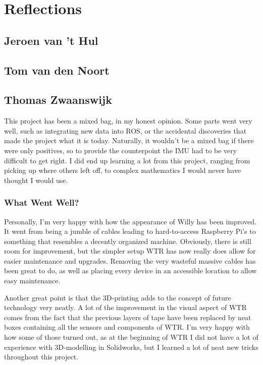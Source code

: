 \section{Reflections}
\subsection{Jeroen van 't Hul}

\newpage

\subsection{Tom van den Noort}

\newpage

\subsection{Thomas Zwaanswijk}
This project has been a mixed bag, in my honest opinion.
Some parts went very well, such as integrating new data into ROS, or the accidental discoveries that made the project what it is today.
Naturally, it wouldn't be a mixed bag if there were only positives, so to provide the counterpoint the IMU had to be very difficult to get right.
I did end up learning a lot from this project, ranging from picking up where others left off, to complex mathematics I would never have thought I would use.

\subsubsection{What Went Well?}
Personally, I'm very happy with how the appearance of Willy has been improved.
It went from being a jumble of cables leading to hard-to-access Raspberry Pi's to something that resembles a decently organized machine.
Obviously, there is still room for improvement, but the simpler setup WTR has now really does allow for easier maintenance and upgrades.
Removing the very wasteful massive cables has been great to do, as well as placing every device in an accessible location to allow easy maintenance.

Another great point is that the 3D-printing adds to the concept of future technology very neatly.
A lot of the improvement in the visual aspect of WTR comes from the fact that the previous layers of tape have been replaced by neat boxes containing all the sensors and components of WTR.
I'm very happy with how some of those turned out, as at the beginning of WTR I did not have a lot of experience with 3D-modelling in Solidworks, but I learned a lot of neat new tricks throughout this project.

